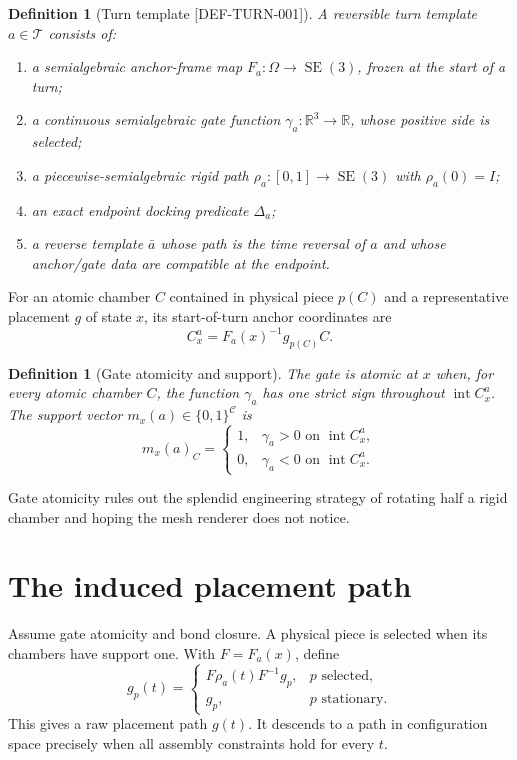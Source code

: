 \documentclass[11pt,openany]{book}
\newcommand{\R}{\mathbb R}
\newcommand{\SE}{\operatorname{SE}}
\newcommand{\Int}{\operatorname{int}}
\newcommand{\States}{\Omega}
\newcommand{\Turns}{\mathcal T}
\newcommand{\claimid}[1]{\textnormal{\sffamily\footnotesize[#1]}}
\theoremstyle{polyplain}
\theoremstyle{polydef}
\newtheorem{definition}[theorem]{Definition}
\begin{document}
\begin{definition}[Turn template \claimid{DEF-TURN-001}]
\label{def:turn-template}
A reversible turn template $a\in\Turns$ consists of:
\begin{enumerate}
  \item a semialgebraic anchor-frame map $F_a:\States\to\SE(3)$, frozen at the start of a turn;
  \item a continuous semialgebraic gate function $\gamma_a:\R^3\to\R$, whose positive side is selected;
  \item a piecewise-semialgebraic rigid path $\rho_a:[0,1]\to\SE(3)$ with $\rho_a(0)=I$;
  \item an exact endpoint docking predicate $\Delta_a$;
  \item a reverse template $\bar a$ whose path is the time reversal of $a$ and whose anchor/gate data are compatible at the endpoint.
\end{enumerate}
\end{definition}

For an atomic chamber $C$ contained in physical piece $p(C)$ and a representative placement $g$ of state $x$, its start-of-turn anchor coordinates are
\[
C_x^a=F_a(x)^{-1}g_{p(C)}C.
\]

\begin{definition}[Gate atomicity and support]
The gate is \emph{atomic at $x$} when, for every atomic chamber $C$, the function $\gamma_a$ has one strict sign throughout $\Int C_x^a$. The support vector $m_x(a)\in\{0,1\}^{\mathcal C}$ is
\[
m_x(a)_C=
\begin{cases}
1,&\gamma_a>0\text{ on }\Int C_x^a,\\
0,&\gamma_a<0\text{ on }\Int C_x^a.
\end{cases}
\]
\end{definition}

Gate atomicity rules out the splendid engineering strategy of rotating half a rigid chamber and hoping the mesh renderer does not notice.

\section{The induced placement path}

Assume gate atomicity and bond closure. A physical piece is selected when its chambers have support one. With $F=F_a(x)$, define
\[
g_p(t)=
\begin{cases}
F\rho_a(t)F^{-1}g_p,&p\text{ selected},\\
g_p,&p\text{ stationary}.
\end{cases}
\]
This gives a raw placement path $g(t)$. It descends to a path in configuration space precisely when all assembly constraints hold for every $t$.
\end{document}
